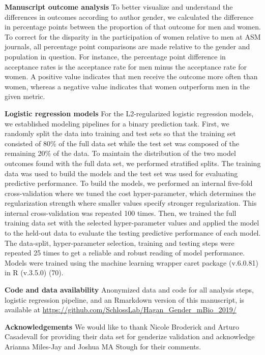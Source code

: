 \documentclass[11pt,]{article}
\begin{document}
\textbf{Manuscript outcome analysis} To better visualize and understand
the differences in outcomes according to author gender, we calculated
the difference in percentage points between the proportion of that
outcome for men and women. To correct for the disparity in the
participation of women relative to men at ASM journals, all percentage
point comparisons are made relative to the gender and population in
question. For instance, the percentage point difference in acceptance
rates is the acceptance rate for men minus the acceptance rate for
women. A positive value indicates that men receive the outcome more
often than women, whereas a negative value indicates that women
outperform men in the given metric.

\textbf{Logistic regression models} For the L2-regularized logistic
regression models, we established modeling pipelines for a binary
prediction task. First, we randomly split the data into training and
test sets so that the training set consisted of 80\% of the full data
set while the test set was composed of the remaining 20\% of the data.
To maintain the distribution of the two model outcomes found with the
full data set, we performed stratified splits. The training data was
used to build the models and the test set was used for evaluating
predictive performance. To build the models, we performed an internal
five-fold cross-validation where we tuned the cost hyper-parameter,
which determines the regularization strength where smaller values
specify stronger regularization. This internal cross-validation was
repeated 100 times. Then, we trained the full training data set with the
selected hyper-parameter values and applied the model to the held-out
data to evaluate the testing predictive performance of each model. The
data-split, hyper-parameter selection, training and testing steps were
repeated 25 times to get a reliable and robust reading of model
performance. Models were trained using the machine learning wrapper
caret package (v.6.0.81) in R (v.3.5.0) (70).

\textbf{Code and data availability} Anonymized data and code for all
analysis steps, logistic regression pipeline, and an Rmarkdown version
of this manuscript, is available at
\url{https://github.com/SchlossLab/Hagan_Gender_mBio_2019/}

\textbf{Acknowledgements} We would like to thank Nicole Broderick and
Arturo Casadevall for providing their data set for genderize validation
and acknowledge Arianna Miles-Jay and Joshua MA Stough for their
comments.
\end{document}
